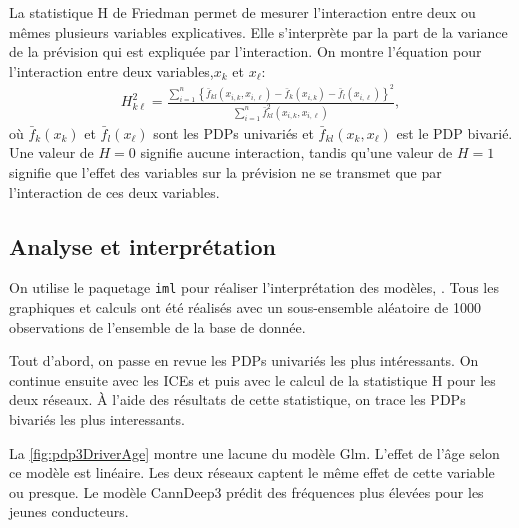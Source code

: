 La statistique H de Friedman permet de mesurer l'interaction entre deux ou mêmes plusieurs variables explicatives. Elle s'interprète par la part de la variance de la prévision qui est expliquée par l'interaction. On montre l'équation pour l'interaction entre deux variables,$x_k$ et $x_\ell$:
\begin{align*}
H_{k \ell}^{2}=\frac{\sum_{i=1}^{n}\left\{\bar{f}_{k l}\left(x_{i, k}, x_{i, \ell}\right)-\bar{f}_{k}\left(x_{i, k}\right)-\bar{f}_{l}\left(x_{i, \ell}\right)\right\}^{2}}{\sum_{i=1}^{n} \bar{f}_{k l}^{2}\left(x_{i, k}, x_{i, \ell}\right)},
\end{align*}
où $\bar{f}_{k}\left(x_{k}\right)$ et $\bar{f}_{l}\left(x_{\ell}\right)$ sont les PDPs univariés et $\bar{f}_{k l}\left(x_{k}, x_{\ell}\right)$ est le PDP bivarié. Une valeur de $H=0$ signifie aucune interaction, tandis qu'une valeur de $H=1$ signifie que l'effet des variables sur la prévision ne se transmet que par l'interaction de ces deux variables.


\subsection{Analyse et interprétation}
\label{subsec:AnalyseInterpret}


On utilise le paquetage \verb=iml= pour réaliser l'interprétation des modèles, \citep{package:iml}. Tous les graphiques et calculs ont été réalisés avec un sous-ensemble aléatoire de 1000 observations de l'ensemble de la base de donnée.


Tout d'abord, on passe en revue les PDPs univariés les plus intéressants. On continue ensuite avec les ICEs et puis avec le calcul de la statistique H pour les deux réseaux. À l'aide des résultats de cette statistique, on trace les PDPs bivariés les plus interessants. 


La \autoref{fig:pdp3DriverAge} montre une lacune du modèle Glm. L'effet de l'âge selon ce modèle est linéaire. Les deux réseaux captent le même effet de cette variable ou presque. Le modèle CannDeep3 prédit des fréquences plus élevées pour les jeunes conducteurs. 
 
